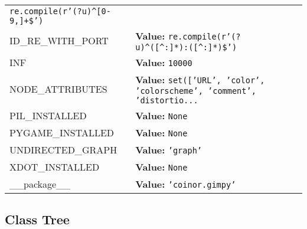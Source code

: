 \begin{longtable}{|p{\varnamewidth}|p{\vardescrwidth}|l}
{\tt re.compile(r'\texttt{(?u)}{\textasciicircum}\texttt{[}0\texttt{-}9,\texttt{]}\texttt{+}\$')}&\\
\cline{1-2}
\raggedright I\-D\-\_\-R\-E\-\_\-W\-I\-T\-H\-\_\-P\-O\-R\-T\- & \raggedright \textbf{Value:} 
{\tt re.compile(r'\texttt{(?u)}{\textasciicircum}\texttt{(}\texttt{[{\textasciicircum}}:\texttt{]}\texttt{*}\texttt{)}:\texttt{(}\texttt{[{\textasciicircum}}:\texttt{]}\texttt{*}\texttt{)}\$')}&\\
\cline{1-2}
\raggedright I\-N\-F\- & \raggedright \textbf{Value:} 
{\tt 10000}&\\
\cline{1-2}
\raggedright N\-O\-D\-E\-\_\-A\-T\-T\-R\-I\-B\-U\-T\-E\-S\- & \raggedright \textbf{Value:} 
{\tt \texttt{set([}\texttt{'}\texttt{URL}\texttt{'}\texttt{, }\texttt{'}\texttt{color}\texttt{'}\texttt{, }\texttt{'}\texttt{colorscheme}\texttt{'}\texttt{, }\texttt{'}\texttt{comment}\texttt{'}\texttt{, }\texttt{'}\texttt{distortio}\texttt{...}}&\\
\cline{1-2}
\raggedright P\-I\-L\-\_\-I\-N\-S\-T\-A\-L\-L\-E\-D\- & \raggedright \textbf{Value:} 
{\tt None}&\\
\cline{1-2}
\raggedright P\-Y\-G\-A\-M\-E\-\_\-I\-N\-S\-T\-A\-L\-L\-E\-D\- & \raggedright \textbf{Value:} 
{\tt None}&\\
\cline{1-2}
\raggedright U\-N\-D\-I\-R\-E\-C\-T\-E\-D\-\_\-G\-R\-A\-P\-H\- & \raggedright \textbf{Value:} 
{\tt \texttt{'}\texttt{graph}\texttt{'}}&\\
\cline{1-2}
\raggedright X\-D\-O\-T\-\_\-I\-N\-S\-T\-A\-L\-L\-E\-D\- & \raggedright \textbf{Value:} 
{\tt None}&\\
\cline{1-2}
\raggedright \_\-\_\-p\-a\-c\-k\-a\-g\-e\-\_\-\_\- & \raggedright \textbf{Value:} 
{\tt \texttt{'}\texttt{coinor.gimpy}\texttt{'}}&\\
\cline{1-2}
\end{longtable}



\subsection{Class Tree}


